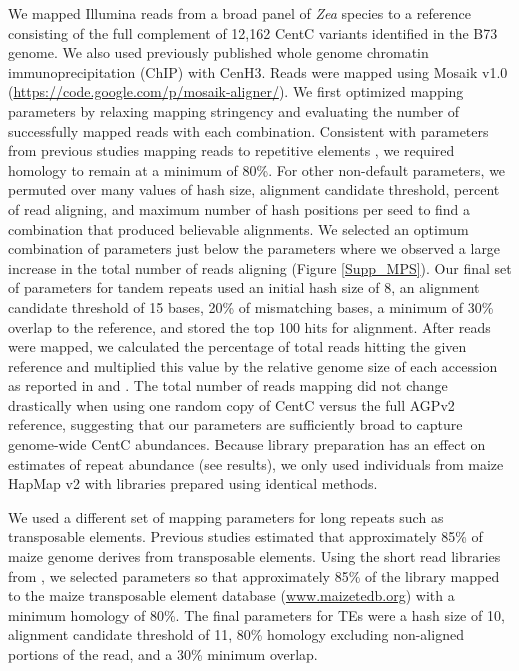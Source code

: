 We mapped Illumina reads from a broad panel of \emph{Zea} species \citep{Chia2012,Tenaillon2011}  to a reference consisting of the full complement of 12,162 CentC variants identified in the B73 genome.  
We also used previously published whole genome chromatin immunoprecipitation (ChIP) \citep{Wolfgruber2009, Wang2013} with CenH3.  Reads were mapped using  Mosaik v1.0 (\url{https://code.google.com/p/mosaik-aligner/}). 
We first optimized mapping parameters by relaxing mapping stringency and evaluating the number of successfully mapped reads with each combination.  
Consistent with parameters from previous studies mapping reads to repetitive elements \citep{Tenaillon2011}, we required homology to remain at a minimum of 80\%.  
For other non-default parameters, we permuted over many values of hash size, alignment candidate threshold,  percent of read aligning, and maximum number of hash positions per seed to find a combination that produced believable alignments.  
We selected an optimum combination of parameters just below the parameters where we observed a large increase in the total number of reads aligning (Figure \ref{Supp_MPS}).
Our final set of parameters for tandem repeats used an initial hash size of 8, an alignment candidate threshold of 15 bases, 20\% of mismatching bases, a minimum of 30\% overlap to the reference, and stored the top 100 hits for alignment.  
After reads were mapped, we calculated the percentage of total reads hitting the given reference and multiplied this value by the relative genome size of each accession as reported in \citet{Chia2012} and \citet{Tenaillon2011}. 
The total number of reads mapping did not change drastically when using one random copy of CentC versus the full AGPv2 reference, suggesting that our parameters are sufficiently broad to capture genome-wide CentC abundances.  
Because library preparation has an effect on estimates of repeat abundance (see results), we only used individuals from maize HapMap v2 \citep{Chia2012} with libraries prepared using identical methods.
	
We used a different set of mapping parameters for long repeats such as transposable elements.  
Previous studies \citep{Schnable2009} estimated that approximately 85\% of maize genome derives from transposable elements.  
Using the short read libraries from \citet{Tenaillon2011}, we selected parameters so that approximately 85\% of the library mapped to the maize transposable element database (\url{www.maizetedb.org}) with a minimum homology of 80\%.  
The final parameters for TEs were a hash size of 10, alignment candidate threshold of 11, 80\% homology excluding non-aligned portions of the read, and a 30\% minimum overlap.

